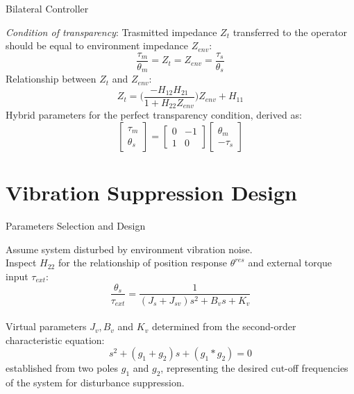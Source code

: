 \documentclass[10pt]{beamer}
\begin{document}
\begin{frame}{Bilateral Controller}

\textit{Condition of transparency}: Trasmitted impedance $ Z_{t} $ transferred to the operator should be equal to environment impedance $ Z_{env} $:
\begin{equation*}
	\frac{\tau_m}{\theta_m} = Z_t = Z_{env} = \frac{\tau_s}{\theta_s}
\end{equation*}
Relationship between $ Z_{t} $ and $ Z_{env} $:
\begin{equation*}
	Z_t = \big(\dfrac{-H_{12} H_{21}}{1 + H_{22} Z_{env}}\big)Z_{env} + H_{11}
\end{equation*}
Hybrid parameters for the perfect transparency condition, derived as:
\begin{equation*}
	\begin{bmatrix}
	\tau_m \\ \theta_s
	\end{bmatrix} = 
	\begin{bmatrix}
	0 & -1 \\ 1 & 0
	\end{bmatrix}
	\begin{bmatrix}
	\theta_m \\ -\tau_s
	\end{bmatrix}
\end{equation*}

\end{frame}

\section{Vibration Suppression Design}

\begin{frame}{Parameters Selection and Design}

Assume system disturbed by environment vibration noise.\\
\bigskip
Inspect $ H_{22} $ for the relationship of position response $ \theta^{res} $ and external torque input $ \tau_{ext} $:
\begin{equation*}
	\dfrac{\theta_s}{\tau_{ext}} = \dfrac{1}{(J_s + J_{sv}) s^2 + B_v s + K_v}
	\label{H_22}
\end{equation*}\\
\bigskip
Virtual parameters $ J_{v}, B_{v} $ and $ K_{v} $ determined from the second-order characteristic equation:
\begin{equation*}
	s^{2} + (g_{1} + g_{2})s + (g_{1}*g_{2}) = 0
\end{equation*}
established from two poles $ g_{1} $ and $ g_{2} $, representing the desired cut-off frequencies of the system for disturbance suppression.

\end{frame}
\end{document}
